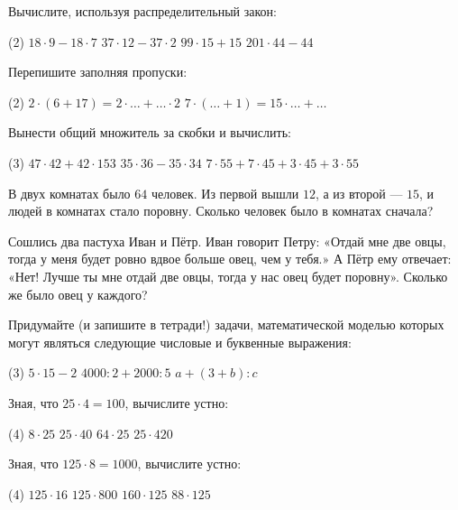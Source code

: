 \begin{class}[number=4]
	\begin{listofex}
	\item Вычислите, используя распределительный закон:
	\begin{tasks}(2)
		\task \( 18\cdot9-18\cdot7 \)
		\task \( 37\cdot12-37\cdot2 \)
		\task \( 99\cdot15+15 \)
		\task \( 201\cdot44-44 \)
	\end{tasks}
	\item Перепишите заполняя пропуски:
	\begin{tasks}(2)
		\task \( 2\cdot(6+17)=2\cdot{\dots}+{\dots}\cdot2 \)
		\task \( 7\cdot({\dots}+1)=15\cdot{\dots}+{\dots} \)
	\end{tasks}
	\item Вынести общий множитель за скобки и вычислить:
	\begin{tasks}(3)
		\task \( 47\cdot42+42\cdot153 \)
		\task \( 35\cdot36-35\cdot34 \)
		\task \( 7\cdot55+7\cdot45+3\cdot45+3\cdot55 \)
	\end{tasks}
	\item В двух комнатах было \( 64 \) человек. Из первой вышли \( 12 \), а из второй --- \( 15 \), и людей в комнатах стало поровну. Сколько человек было в комнатах сначала?
	\item Сошлись два пастуха Иван и Пётр. Иван говорит Петру: «Отдай мне две овцы,
	тогда у меня будет ровно вдвое больше овец, чем у тебя.» А Пётр ему отвечает: «Нет!
	Лучше ты мне отдай две овцы, тогда у нас овец будет поровну». Сколько же было овец у
	каждого?
	\item Придумайте (и запишите в тетради!) задачи, математической моделью которых могут
	являться следующие числовые и буквенные выражения:
	\begin{tasks}(3)
		\task \( 5\cdot15-2 \)
		\task \( 4000:2+2000:5 \)
		\task \( a+(3+b):c \)
	\end{tasks}
	\item Зная, что \( 25\cdot4=100 \), вычислите устно:
	\begin{tasks}(4)
		\task \( 8\cdot25 \)
		\task \( 25\cdot40 \)
		\task \( 64\cdot25 \)
		\task \( 25\cdot420 \)
	\end{tasks}
	\item Зная, что \( 125\cdot8=1000 \), вычислите устно:
	\begin{tasks}(4)
		\task \( 125\cdot16 \)
		\task \( 125\cdot800 \)
		\task \( 160\cdot125 \)
		\task \( 88\cdot125 \)
	\end{tasks}
	\end{listofex}
\end{class}

